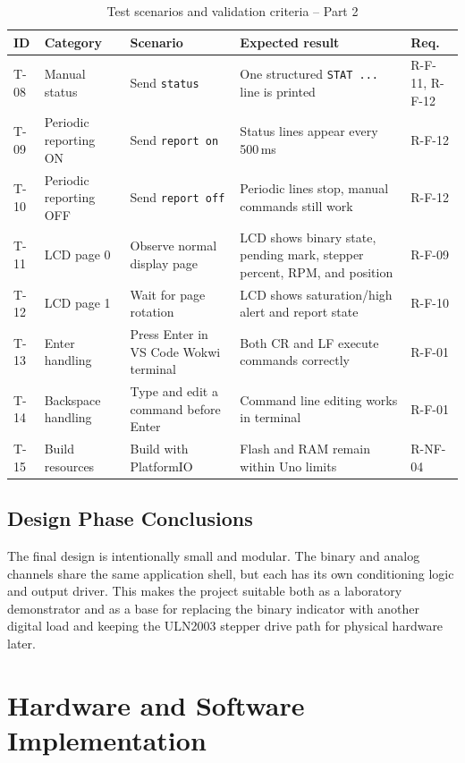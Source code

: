 \documentclass[12pt]{article}
\begin{document}
{\begin{table}[H]
\centering
\begin{tabular}{p{0.8cm} p{2.0cm} p{3.8cm} p{3.8cm} p{0.9cm}}
\toprule
\textbf{ID} & \textbf{Category} & \textbf{Scenario} & \textbf{Expected result} & \textbf{Req.} \\
\midrule
T-08 & Manual status & Send \texttt{status} & One structured \texttt{STAT ...} line is printed & R-F-11, R-F-12 \\
T-09 & Periodic reporting ON & Send \texttt{report on} & Status lines appear every 500\,ms & R-F-12 \\
T-10 & Periodic reporting OFF & Send \texttt{report off} & Periodic lines stop, manual commands still work & R-F-12 \\
T-11 & LCD page 0 & Observe normal display page & LCD shows binary state, pending mark, stepper percent, RPM, and position & R-F-09 \\
T-12 & LCD page 1 & Wait for page rotation & LCD shows saturation/high alert and report state & R-F-10 \\
T-13 & Enter handling & Press Enter in VS Code Wokwi terminal & Both CR and LF execute commands correctly & R-F-01 \\
T-14 & Backspace handling & Type and edit a command before Enter & Command line editing works in terminal & R-F-01 \\
T-15 & Build resources & Build with PlatformIO & Flash and RAM remain within Uno limits & R-NF-04 \\
\bottomrule
\end{tabular}
\caption{Test scenarios and validation criteria -- Part 2}
\label{tab:tests2}
\end{table}
}

\subsection{Design Phase Conclusions}
\hspace{0.8cm} The final design is intentionally small and modular. The binary and analog channels share the same application shell, but each has its own conditioning logic and output driver. This makes the project suitable both as a laboratory demonstrator and as a base for replacing the binary indicator with another digital load and keeping the ULN2003 stepper drive path for physical hardware later.

\section{Hardware and Software Implementation}
\end{document}
